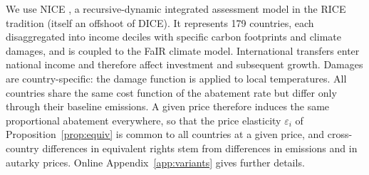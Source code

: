 \documentclass[12pt,english]{article}
\theoremstyle{remark}
\begin{document}
We use NICE \citep{young-brun_within-country_2025}, a recursive-dynamic integrated assessment model in the RICE tradition (itself an offshoot of DICE). It represents 179 countries, each disaggregated into income deciles with specific carbon footprints and climate damages, and is coupled to the FaIR climate model. 
International transfers enter national income and therefore affect investment and subsequent growth. %
Damages are country-specific: the damage function is applied to local temperatures. 
All countries share the same cost function of the abatement rate %
but differ only through their baseline emissions. %
A given price therefore induces the same proportional abatement everywhere, so that the price elasticity $\varepsilon_i$ of Proposition~\ref{prop:equiv} is common to all countries at a given price, and cross-country differences in equivalent rights stem from differences in emissions and in autarky prices. Online Appendix~\ref{app:variants} gives further details.%
\end{document}
